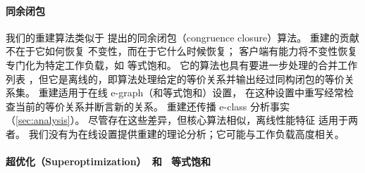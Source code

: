 \paragraph{同余闭包}

我们的重建算法类似于 \citet{downey-cse} 提出的同余闭包（congruence closure）算法。
重建的贡献不在于它如何恢复 \egraph 不变性，而在于它什么时候恢复；
  客户端有能力将不变性恢复专门化为特定工作负载，如 等式饱和。
它的算法也具有要进一步处理的合并工作列表
  ，但它是离线的，即算法处理给定的等价关系并输出经过同构闭包的等价关系集。
重建适用于在线 e-graph（和等式饱和）设置，
  在这种设置中重写经常检查当前的等价关系并断言新的关系。
重建还传播 e-class 分析事实（\autoref{sec:analysis}）。
尽管存在这些差异，但核心算法相似，离线性能特征 \cite{downey-cse} 适用于两者。
我们没有为在线设置提供重建的理论分析；它可能与工作负载高度相关。

\paragraph{超优化（Superoptimization）~和~ 等式饱和}

